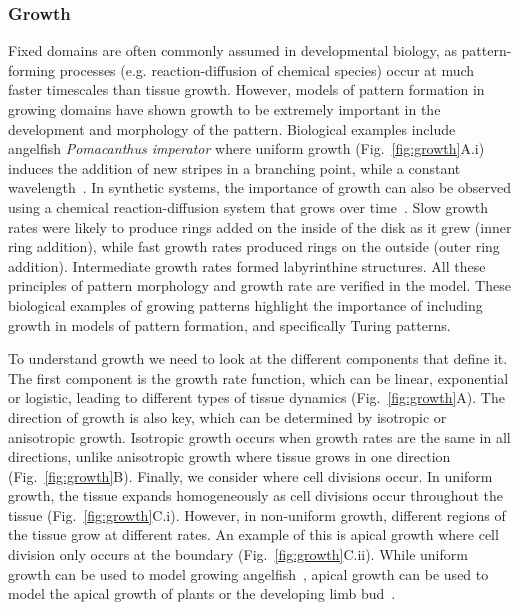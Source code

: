  \subsubsection{Growth}\label{growth_intro}
Fixed domains are often commonly assumed in developmental biology, as pattern-forming processes (e.g. reaction-diffusion of chemical species) occur at much faster timescales than tissue growth. %
However, models of pattern formation in growing domains have shown growth to be extremely important in the development and morphology of the pattern.
Biological examples include angelﬁsh \textit{Pomacanthus imperator} where uniform growth (Fig.~\ref{fig:growth}A.i) induces the addition of new stripes in a branching point, while a constant wavelength~\parencite{Kondo1995}.
In synthetic systems, the importance of growth can also be observed using a chemical reaction-diffusion system that grows over time~\parencite{Konow2019}.
Slow growth rates were likely to produce rings added on the inside of the disk as it grew (inner ring addition), while fast growth rates produced rings on the outside (outer ring addition).
Intermediate growth rates formed labyrinthine structures.
All these principles of pattern morphology and growth rate are verified in the model.
These biological examples of growing patterns highlight the importance of including growth in models of pattern formation, and specifically Turing patterns.

To understand growth we need to look at the different components that define it.
The first component is the growth rate function, which can be linear, exponential or logistic, leading to different types of tissue dynamics (Fig.~\ref{fig:growth}A).
The direction of growth is also key, which can be determined by isotropic or anisotropic growth.
Isotropic growth occurs when growth rates are the same in all directions, unlike anisotropic growth where tissue grows in one direction (Fig.~\ref{fig:growth}B).
Finally, we consider where cell divisions occur.
In uniform growth, the tissue expands homogeneously as cell divisions occur throughout the tissue (Fig.~\ref{fig:growth}C.i).
However, in non-uniform growth, different regions of the tissue grow at different rates.
An example of this is apical growth where cell division only occurs at the boundary (Fig.~\ref{fig:growth}C.ii).
While uniform growth can be used to model growing angelfish~\parencite{Kondo1995}, apical growth can be used to model the apical growth of plants or the developing limb bud~\parencite{crampin2002pattern}.


